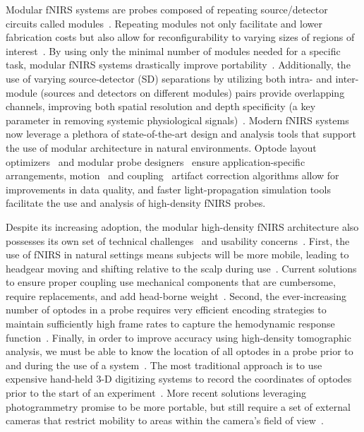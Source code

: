 Modular fNIRS systems are probes composed of repeating source/detector circuits called modules~\cite{Chitnis2016}. Repeating modules not only facilitate and lower fabrication costs but also allow for reconfigurability to varying sizes of regions of interest~\cite{Zhao2017}. By using only the minimal number of modules needed for a specific task, modular fNIRS systems drastically improve portability~\cite{Yucel2017}. Additionally, the use of varying source-detector (SD) separations by utilizing both intra- and inter-module (sources and detectors on different modules) pairs provide overlapping channels, improving both spatial resolution and depth specificity (a key parameter in removing systemic physiological signals)~\cite{Gregg2010, VidalRosas2021}. Modern fNIRS systems now leverage a plethora of state-of-the-art design and analysis tools that support the use of modular architecture in natural environments. Optode layout optimizers~\cite{Machado2018, Aasted2015, ZimeoMorais2018, Brigadoi2018} and modular probe designers~\cite{Vanegas2022} ensure application-specific arrangements, motion~\cite{Huppert2009, Santosa2018} and coupling~\cite{Hernandez2020} artifact correction algorithms allow for improvements in data quality, and faster light-propagation simulation tools~\cite{Nirfast,Fang2009} facilitate the use and analysis of high-density fNIRS probes. 

Despite its increasing adoption, the modular high-density fNIRS architecture also possesses its own set of technical challenges~\cite{Pinti2018, Herold2017} and usability concerns~\cite{Moon2019, Hasan2022}. First, the use of fNIRS in natural settings means subjects will be more mobile, leading to headgear moving and shifting relative to the scalp during use~\cite{Herold2017, Perrey2014}. Current solutions to ensure proper coupling use mechanical components that are cumbersome, require replacements, and add head-borne weight~\cite{Bartkowski2019, Bci2017}. Second, the ever-increasing number of optodes in a probe requires very efficient encoding strategies to maintain sufficiently high frame rates to capture the hemodynamic response function~\cite{Maki1995, Everdell2005, Alper2022}. Finally, in order to improve accuracy using high-density tomographic analysis, we must be able to know the location of all optodes in a probe prior to and during the use of a system~\cite{Mazzonetto2022}. The most traditional approach is to use expensive hand-held 3-D digitizing systems to record the coordinates of optodes prior to the start of an experiment~\cite{Pinti2018, Zhao2020}. More recent solutions leveraging photogrammetry promise to be more portable, but still require a set of external cameras that restrict mobility to areas within the camera's field of view~\cite{VidalRosas2021, Mazzonetto2022}. 

